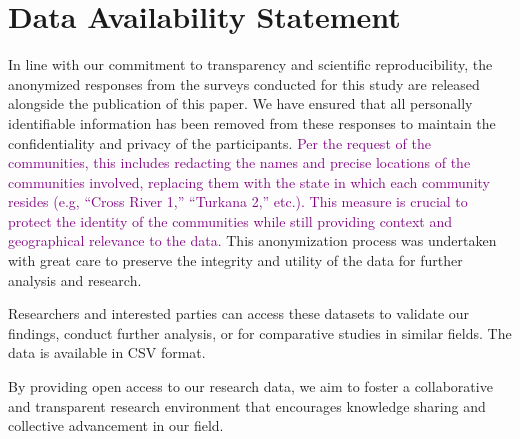 \section*{Data Availability Statement}
In line with our commitment to transparency and scientific reproducibility, the anonymized responses from the surveys conducted for this study are released alongside the publication of this paper. We have ensured that all personally identifiable information has been removed from these responses to maintain the confidentiality and privacy of the participants. \textcolor{purple}{Per the request of the communities, this includes redacting the names and precise locations of the communities involved, replacing them with the state in which each community resides (e.g, ``Cross River 1,'' ``Turkana 2,'' etc.). This measure is crucial to protect the identity of the communities while still providing context and geographical relevance to the data.} This anonymization process was undertaken with great care to preserve the integrity and utility of the data for further analysis and research.

Researchers and interested parties can access these datasets to validate our findings, conduct further analysis, or for comparative studies in similar fields. The data is available in CSV format.

By providing open access to our research data, we aim to foster a collaborative and transparent research environment that encourages knowledge sharing and collective advancement in our field.